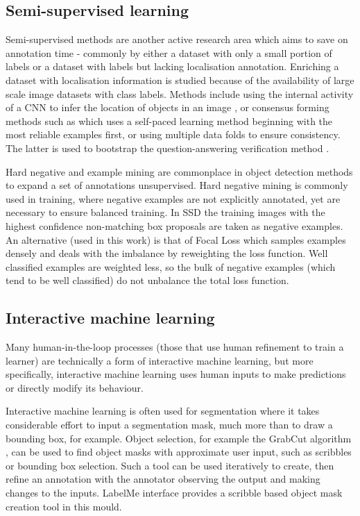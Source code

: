 \subsection{Semi-supervised learning}

Semi-supervised methods are another active research area which aims to save on annotation time - commonly by either a dataset with only a small portion of labels or a dataset with labels but lacking localisation annotation. Enriching a dataset with localisation information is studied because of the availability of large scale image datasets with class labels. Methods include using the internal activity of a \gls{CNN} to infer the location of objects in an image \cite{Sivic2015}, or consensus forming methods such as \cite{Sangineto} which uses a self-paced learning method beginning with the most reliable examples first, or \cite{Cinbis2017} using multiple data folds to ensure consistency. The latter is used to bootstrap the question-answering verification method \cite{Papadopoulos2016}.

Hard negative and example mining are commonplace in object detection methods to expand a set of annotations unsupervised. Hard negative mining is commonly used in training, where negative examples are not explicitly annotated, yet are necessary to ensure balanced training. In \gls{SSD} \cite{Liu2016a} the training images with the highest confidence non-matching  box proposals are taken as negative examples. An alternative (used in this work) is that of Focal Loss \cite{Lin2017} which samples examples densely and deals with the imbalance by reweighting the loss function. Well classified examples are weighted less, so the bulk of negative examples (which tend to be well classified) do not unbalance the total loss function.

\subsection{Interactive machine learning}

Many human-in-the-loop processes (those that use human refinement to train a learner) are technically a form of interactive machine learning, but more specifically, interactive machine learning uses human inputs to make predictions or directly modify its behaviour.

Interactive machine learning is often used for segmentation where it takes considerable effort to input a segmentation mask, much more than to draw a bounding box, for example. Object selection, for example the GrabCut algorithm \cite{Rother}, can be used to find object masks with approximate user input, such as scribbles or bounding box selection. Such a tool can be used iteratively to create, then refine an annotation with the annotator observing the output and making changes to the inputs.  LabelMe \cite{Russell2007} interface provides a scribble based object mask creation tool in this mould. 

